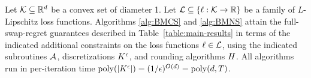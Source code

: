 \documentclass[final,12pt]{alt2025}
\begin{document}
\begin{theorem}\label{thm:full-main}
    Let $\mathcal{K} \subseteq \mathbb{R}^d$ be a convex set of diameter 1.  Let $\mathcal{L} \subseteq \left\{\ell: \mathcal{K} \to \mathbb{R}\right\}$ be a family of $L$-Lipschitz loss functions.  Algorithms \ref{alg:BMCS} and \ref{alg:BMNS} attain the full-swap-regret guarantees described in Table~\ref{table:main-results} in terms of the indicated additional constraints on the loss functions $\ell \in \mathcal{L}$, using the indicated subroutines $\mathcal{A}$, discretizations $K^{\epsilon}$, and rounding algorithms $H$. All algorithms run in per-iteration time $\operatorname{poly}(|K^{\epsilon}|) = (1/\epsilon)^{O(d)} = \operatorname{poly}(d, T)$.
\end{theorem}
\end{document}
